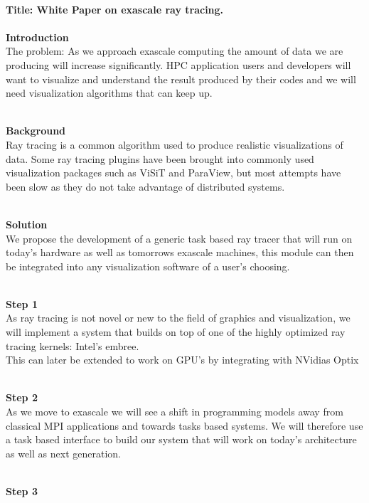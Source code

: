 \documentclass[12pt]{article}
\begin{document}
\textbf{\\Title: White Paper on exascale ray tracing.}\\

\textbf {\\ Introduction} \\

The problem:  As we approach exascale computing the amount of data we are producing will increase significantly.  HPC application users and developers will want to visualize and understand the result produced by their codes and we will need visualization algorithms that can keep up.

\textbf {\\ Background} \\

Ray tracing is a common algorithm used to produce realistic visualizations of data.  Some ray tracing plugins have been brought into commonly used visualization packages such as ViSiT and ParaView, but most attempts have been slow as they do not take advantage of distributed systems.  

\textbf {\\ Solution} \\

We propose the development of a generic task based ray tracer that will run on today’s hardware as well as tomorrows exascale machines, this module can then be integrated into any visualization software of a user’s choosing. 

\textbf {\\ Step 1} \\

As ray tracing is not novel or new to the field of graphics and visualization, we will implement a system that builds on top of one of the highly optimized ray tracing kernels: Intel’s embree.
\\ This can later be extended to work on GPU’s by integrating with NVidias Optix

\textbf {\\ Step 2} \\

As we move to exascale we will see a shift in programming models away from classical MPI applications and towards tasks based systems.  We will therefore use a task based interface to build our system that will work on today’s architecture as well as next generation.

\textbf {\\ Step 3} \\
\end{document}
